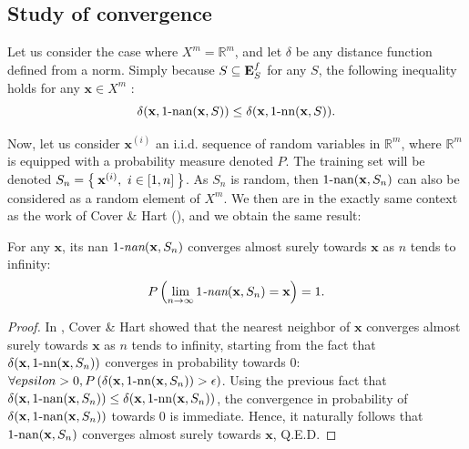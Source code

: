 \subsection{Study of convergence}

Let us consider the case where $X^m=\mathbb{R}^m$, and let $\delta$ be any
distance function defined from a norm. Simply because $S \subseteq \mathbf{E}_{S}^{f}$ for
any $S$, the
following inequality holds for any $\mathbf{x} \in X^m$ :
$$\delta(\mathbf{x}, 1\text{-nan}(\mathbf{x},S)) \leq \delta(\mathbf{x},
1\mbox{-nn}(\mathbf{x},S)).$$


Now, let us consider  $\mathbf{x}^{(i)}$ an i.i.d. sequence of random variables
in $\mathbb{R}^m$, where $\mathbb{R}^m$ is equipped with a probability measure
denoted $P$. The training set will be denoted $S_n=\Set{\mathbf{x}^{(i)}, ~ i
\in [1, n]}$. As $S_n$ is random, then $1\text{-nan}(\mathbf{x},S_n)$ can also be
considered as a random element of $X^m$.  We then are in the exactly same
context as the work of Cover \& Hart (\cite{CovHarTIT67}), and we obtain the
same result:
\begin{property}
  \label{PROPER:convergence_nan}
  For any $\mathbf{x}$, its nan $1\emph{-nan}(\mathbf{x}, S_n)$ converges almost
  surely towards $\mathbf{x}$ as $n$ tends to infinity:
  $$P\left(\lim_{n \to \infty} 1\emph{-nan}(\mathbf{x}, S_n) = \mathbf{x}\right) =
  1.$$
\end{property}
\begin{proof}
  In \cite{CovHarTIT67}, Cover \& Hart showed that the nearest neighbor of
  $\mathbf{x}$ converges almost surely towards $\mathbf{x}$ as $n$ tends to
  infinity, starting from the fact that $\delta(\mathbf{x}, 1\mbox{-nn}(\mathbf{x},
  S_n))$ converges in probability towards $0$: $\forall epsilon > 0,
  P\left(\delta(\mathbf{x}, 1\mbox{-nn}(\mathbf{x}, S_n)) > \epsilon\right)$. Using the
  previous fact that $\delta(\mathbf{x}, 1\text{-nan}(\mathbf{x},S_n)) \leq
  \delta(\mathbf{x}, 1\mbox{-nn}(\mathbf{x},S_n))$, the convergence in probability of
  $\delta(\mathbf{x}, 1\text{-nan}(\mathbf{x},S_n))$ towards $0$ is immediate. Hence,
  it naturally follows that $1\text{-nan}(\mathbf{x}, S_n)$ converges almost surely
  towards $\mathbf{x}$, Q.E.D.
\end{proof}

